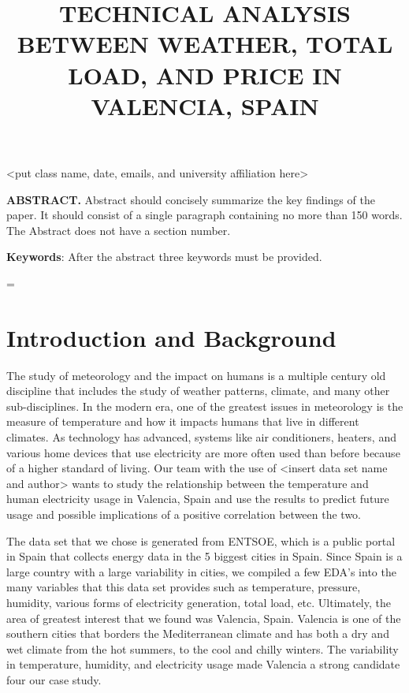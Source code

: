 \documentclass[10pt]{article}
\title{\renewcommand{\baselinestretch}{1.17}\normalsize\bf%
\uppercase{Technical Analysis Between Weather, Total Load, and Price in Valencia, Spain}
}
\begin{document}
\date{}

\maketitle

\vspace{-0.5cm}

\begin{center}
{\footnotesize 
<put class name, date, emails, and university affiliation here>
}
\end{center}
\bigskip
\noindent
{\small{\bf ABSTRACT.}
Abstract should concisely
summarize the key findings of the paper. It should consist 
of a single paragraph containing no more than 150 words. 
The Abstract does not have a section number.
}

\medskip
\noindent
{\small{\bf Keywords}{:} 
After the abstract three keywords must be provided.
}

\baselineskip=\normalbaselineskip

\section{Introduction and Background}\label{sec:1}

The study of meteorology and the impact on humans is a multiple century old discipline that includes the study of weather patterns, climate, and many other sub-disciplines. In the modern era, one of the greatest issues in meteorology is the measure of temperature and how it impacts humans that live in different climates. As technology has advanced, systems like air conditioners, heaters, and various home devices that use electricity are more often used than before because of a higher standard of living. Our team with the use of <insert data set name and author> wants to study the relationship between the temperature and human electricity usage in Valencia, Spain and use the results to predict future usage and possible implications of a positive correlation between the two. 

The data set that we chose is generated from ENTSOE, which is a public portal in Spain that collects energy data in the 5 biggest cities in Spain. Since Spain is a large country with a large variability in cities, we compiled a few EDA’s into the many variables that this data set provides such as temperature, pressure, humidity, various forms of electricity generation, total load, etc. Ultimately, the area of greatest interest that we found was Valencia, Spain. Valencia is one of the southern cities that borders the Mediterranean climate and has both a dry and wet climate from the hot summers, to the cool and chilly winters. The variability in temperature, humidity, and electricity usage made Valencia a strong candidate four our case study.
\end{document}
